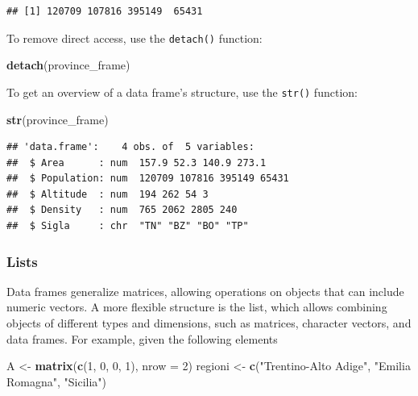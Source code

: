 \documentclass[
]{article}
\newenvironment{Shaded}{\begin{snugshade}}{\end{snugshade}}
\newcommand{\AttributeTok}[1]{\textcolor[rgb]{0.13,0.29,0.53}{#1}}
\newcommand{\DecValTok}[1]{\textcolor[rgb]{0.00,0.00,0.81}{#1}}
\newcommand{\FunctionTok}[1]{\textcolor[rgb]{0.13,0.29,0.53}{\textbf{#1}}}
\newcommand{\NormalTok}[1]{#1}
\newcommand{\OtherTok}[1]{\textcolor[rgb]{0.56,0.35,0.01}{#1}}
\newcommand{\StringTok}[1]{\textcolor[rgb]{0.31,0.60,0.02}{#1}}
\begin{document}
\begin{verbatim}
## [1] 120709 107816 395149  65431
\end{verbatim}

To remove direct access, use the \texttt{detach()} function:

\begin{Shaded}
\begin{Highlighting}[]
\FunctionTok{detach}\NormalTok{(province\_frame)}
\end{Highlighting}
\end{Shaded}

To get an overview of a data frame's structure, use the \texttt{str()}
function:

\begin{Shaded}
\begin{Highlighting}[]
\FunctionTok{str}\NormalTok{(province\_frame)}
\end{Highlighting}
\end{Shaded}

\begin{verbatim}
## 'data.frame':    4 obs. of  5 variables:
##  $ Area      : num  157.9 52.3 140.9 273.1
##  $ Population: num  120709 107816 395149 65431
##  $ Altitude  : num  194 262 54 3
##  $ Density   : num  765 2062 2805 240
##  $ Sigla     : chr  "TN" "BZ" "BO" "TP"
\end{verbatim}

\hypertarget{lists}{%
\subsubsection{Lists}\label{lists}}

Data frames generalize matrices, allowing operations on objects that can
include numeric vectors. A more flexible structure is the list, which
allows combining objects of different types and dimensions, such as
matrices, character vectors, and data frames. For example, given the
following elements

\begin{Shaded}
\begin{Highlighting}[]
\NormalTok{A }\OtherTok{\textless{}{-}} \FunctionTok{matrix}\NormalTok{(}\FunctionTok{c}\NormalTok{(}\DecValTok{1}\NormalTok{, }\DecValTok{0}\NormalTok{, }\DecValTok{0}\NormalTok{, }\DecValTok{1}\NormalTok{), }\AttributeTok{nrow =} \DecValTok{2}\NormalTok{)}
\NormalTok{regioni }\OtherTok{\textless{}{-}} \FunctionTok{c}\NormalTok{(}\StringTok{"Trentino{-}Alto Adige"}\NormalTok{, }\StringTok{"Emilia Romagna"}\NormalTok{, }\StringTok{"Sicilia"}\NormalTok{)}
\end{Highlighting}
\end{Shaded}
\end{document}

